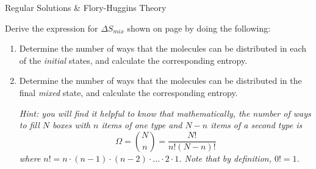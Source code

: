 \begin{activity}{Regular Solutions \& Flory-Huggins Theory}
\begin{exercises}
\begin{solution}
{					}\end{solution}
					
		\exercise \label{\labelbase:exc:idealmixing} Derive the expression for $\Delta S_{mix}$ shown on page \pageref{\labelbase:eqn:idealS} by doing the following:
		
			\begin{enumerate}
				\item Determine the number of ways that the molecules can be distributed in each of the \emph{initial} states, and calculate the corresponding entropy.
				
					\begin{solution}
					\end{solution}
				
				\item Determine the number of ways that the molecules can be distributed in the final \emph{mixed} state, and calculate the corresponding entropy.
				
					\emph{Hint: you will find it helpful to know that mathematically, the number of ways to fill $N$ boxes with $n$ items of one type and $N-n$ items of a second type is}
	\begin{equation*}
		\Omega = {N \choose n} = \frac{N!}{n!(N-n)!}
	\end{equation*}
	\emph{where $n! = n\cdot(n-1)\cdot(n-2)\cdot\dots\cdot 2 \cdot 1$.	Note that by definition, $0!=1$.}
				
					\begin{solution}
\end{solution}
\end{enumerate}
\end{exercises}
\end{activity}
